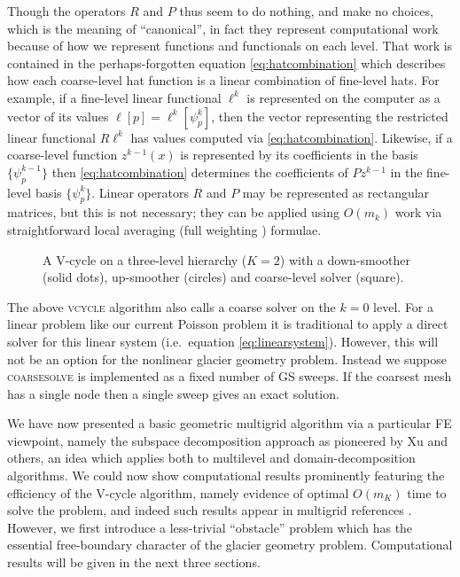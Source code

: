 \documentclass[letterpaper,final,12pt,reqno]{amsart}
\numberwithin{equation}{section}
\numberwithin{figure}{section}
\numberwithin{table}{section}
\begin{document}
Though the operators $R$ and $P$ thus seem to do nothing, and make no choices, which is the meaning of ``canonical'', in fact they represent computational work because of how we represent functions and functionals on each level.  That work is contained in the perhaps-forgotten equation \eqref{eq:hatcombination} which describes how each coarse-level hat function is a linear combination of fine-level hats.  For example, if a fine-level linear functional $\ell^k$ is represented on the computer as a vector of its values $\ell[p] = \ell^k[\psi_p^k]$, then the vector representing the restricted linear functional $R \ell^k$ has values computed via \eqref{eq:hatcombination}.  Likewise, if a coarse-level function $z^{k-1}(x)$ is represented by its coefficients in the basis $\{\psi_p^{k-1}\}$ then \eqref{eq:hatcombination} determines the coefficients of $P z^{k-1}$ in the fine-level basis $\{\psi_p^k\}$.  Linear operators $R$ and $P$ may be represented as rectangular matrices, but this is not necessary; they can be applied using $O(m_k)$ work via straightforward local averaging (full weighting \cite{Briggsetal2000}) formulae.

\begin{figure}

\caption{A V-cycle on a three-level hierarchy ($K=2$) with a down-smoother (solid dots), up-smoother (circles) and coarse-level solver (square).}
\label{fig:vcycle}
\end{figure}

The above \textsc{vcycle} algorithm also calls a coarse solver on the $k=0$ level.  For a linear problem like our current Poisson problem it is traditional to apply a direct solver for this linear system (i.e.~equation \eqref{eq:linearsystem}).  However, this will not be an option for the nonlinear glacier geometry problem.  Instead we suppose \textsc{coarsesolve} is implemented as a fixed number of GS sweeps.  If the coarsest mesh has a single node then a single sweep gives an exact solution.

We have now presented a basic geometric multigrid algorithm via a particular FE viewpoint, namely the subspace decomposition approach as pioneered by Xu \cite{Xu1992} and others, an idea which applies both to multilevel and domain-decomposition algorithms.  We could now show computational results prominently featuring the efficiency of the V-cycle algorithm, namely evidence of optimal $O(m_K)$ time to solve the problem, and indeed such results appear in multigrid references \cite{Briggsetal2000,Bueler2021,Elmanetal2014,Trottenbergetal2001}.  However, we first introduce a less-trivial ``obstacle'' problem which has the essential free-boundary character of the glacier geometry problem.  Computational results will be given in the next three sections.
\end{document}
